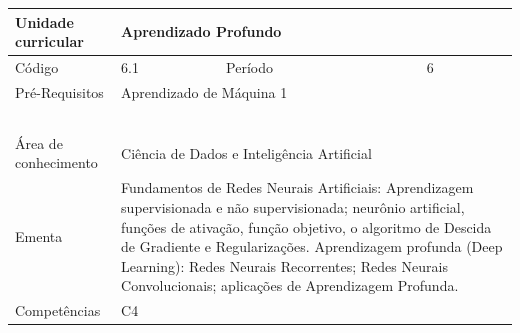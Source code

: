 \clearpage
\newpage

\begin{quadro}[ht!]
  \centering\scriptsize
\caption{Unidade Curricular Aprendizado Profundo}

\begin{tabular}{|p{2.5cm}|p{2.5cm}|p{2.5cm}|p{2.5cm}|p{2.5cm}|}\hline

  Unidade curricular & \multicolumn{4}{p{10cm}|}{ Aprendizado Profundo }\\\hline
  Código & 6.1 & Período & \multicolumn{2}{p{5cm}|}{ 6 }\\\hline
  Pré-Requisitos & \multicolumn{4}{p{10cm}|}{ Aprendizado de Máquina 1 } \\\hline
  \cellcolor{blue1}{ CH PRESENCIAL } &
    \cellcolor{blue1}{CH EAD Síncrona} &
    \cellcolor{blue1}{CH EAD Síncrona Mediada} &
    \cellcolor{blue1}{CH EAD Assíncrona} &
    \cellcolor{blue1}{CH APCC} \\\hline
  \cellcolor{blue1}{ 60 } &
    \cellcolor{blue1}{ 0 } &
    \cellcolor{blue1}{ 0 } &
    \cellcolor{blue1}{ 0 } &
    \cellcolor{blue1}{0} \\\hline
  \cellcolor{blue1}{ CH Teórica } &
    \cellcolor{blue1}{CH Prática} &
    \cellcolor{blue1}{CH Humanidades} &
    \cellcolor{blue1}{CH Extensão} &
    \cellcolor{blue1}{CH EAD TOTAL} \\\hline
  \cellcolor{blue1}{ 30 } &
    \cellcolor{blue1}{ 30 } &
    \cellcolor{blue1}{ 0 } &
    \cellcolor{blue1}{ 0 } &
    \cellcolor{blue1}{ 0 } \\\hline
  \cellcolor{blue1}{CARGA-HORÁRIA TOTAL} & \multicolumn{4}{p{10cm}|}{ \cellcolor{blue1}{ 60 } } \\\hline
  Área de conhecimento & \multicolumn{4}{p{10cm}|}{ Ciência de Dados e Inteligência Artificial } \\\hline
  Ementa & \multicolumn{4}{p{10cm}|}{ Fundamentos de Redes Neurais Artificiais: Aprendizagem supervisionada e não supervisionada; neurônio artificial, funções de ativação, função objetivo, o algoritmo de Descida de Gradiente e Regularizações. Aprendizagem profunda (Deep Learning): Redes Neurais Recorrentes; Redes Neurais Convolucionais; aplicações de Aprendizagem Profunda. } \\\hline
  Competências & \multicolumn{4}{p{10cm}|}{ C4 } \\\hline


  
	\end{tabular}

\end{quadro}



